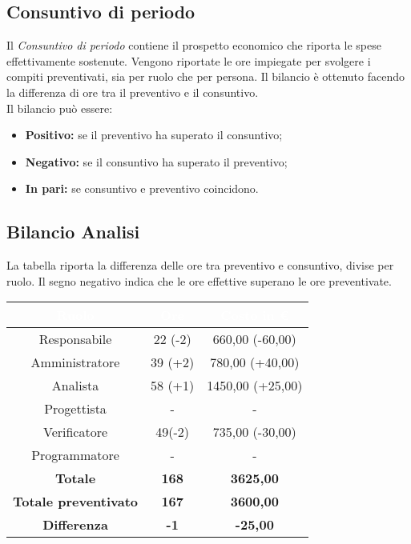 \begin{flushleft}
    \chapter{Consuntivo di periodo}
    Il \textit{Consuntivo di periodo} contiene il prospetto economico che riporta le spese effettivamente sostenute. Vengono riportate le ore impiegate per svolgere i compiti preventivati, sia per
    ruolo che per persona. Il bilancio è ottenuto facendo la differenza di ore tra il preventivo e il consuntivo.\\
    Il bilancio può essere:
    \begin{itemize}
        \item \textbf{Positivo:} se il preventivo ha superato il consuntivo;
        \item \textbf{Negativo:} se il consuntivo ha superato il preventivo;
        \item \textbf{In pari:} se consuntivo e preventivo coincidono.
    \end{itemize}

   \newpage
    \section{Bilancio Analisi}
    La tabella riporta la differenza delle ore tra preventivo e consuntivo, divise per ruolo. Il segno negativo indica che le ore effettive superano le ore preventivate.  
      
	\begin{table}[ht]
		\begin{center}
			\begin{tabular}{ccc}
				\rowcolor{coolblack}
				\hline
				\textcolor{white}{Ruolo} & \textcolor{white}{Ore} & \textcolor{white}{Costo in \euro}\\
				\hline
				Responsabile   & 22 (-2)  &  660,00 (-60,00) 	\\ 
				Amministratore & 39 (+2)  &  780,00 (+40,00) 	\\ 
				Analista       & 58 (+1)  &  1450,00 (+25,00)   	\\ 
				Progettista    & -  	 &  - 					\\ 
				Verificatore   & 49(-2)  &  735,00 (-30,00) 	\\ 
				Programmatore  & -       &  -    		 		\\ \hline
				\textbf{Totale}& \textbf{168} & \textbf{3625,00}	\\ \hline 
				\textbf{Totale preventivato}& \textbf{167} & \textbf{3600,00}\\ \hline 
				\textbf{Differenza}& \textbf{-1} & \textbf{-25,00 }	\\ \hline  
			\end{tabular}
			

\end{center}
\end{table}
\end{flushleft}
